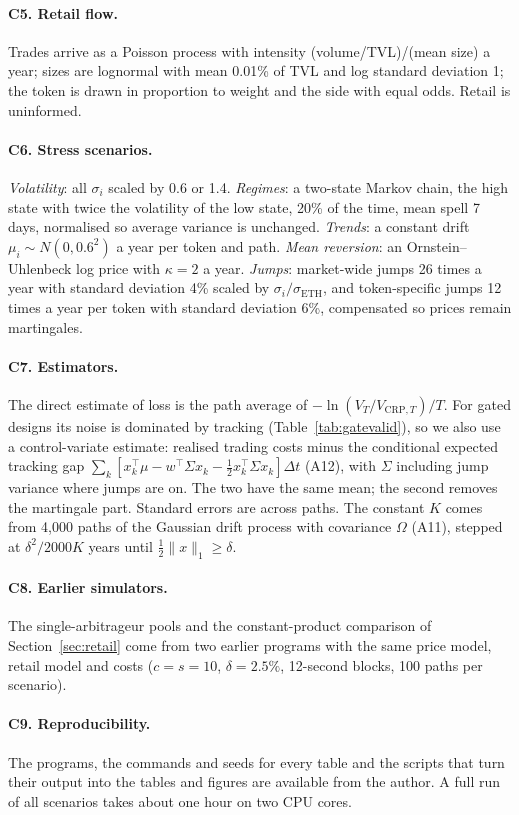 \paragraph{C5. Retail flow.} Trades arrive as a Poisson process with intensity (volume/TVL)/(mean size) a year; sizes are lognormal with mean 0.01\% of TVL and log standard deviation 1; the token is drawn in proportion to weight and the side with equal odds. Retail is uninformed.

\paragraph{C6. Stress scenarios.} \emph{Volatility}: all $\sigma_i$ scaled by 0.6 or 1.4. \emph{Regimes}: a two-state Markov chain, the high state with twice the volatility of the low state, 20\% of the time, mean spell 7 days, normalised so average variance is unchanged. \emph{Trends}: a constant drift $\mu_i\sim N(0,0.6^2)$ a year per token and path. \emph{Mean reversion}: an Ornstein--Uhlenbeck log price with $\kappa=2$ a year. \emph{Jumps}: market-wide jumps 26 times a year with standard deviation 4\% scaled by $\sigma_i/\sigma_{\mathrm{ETH}}$, and token-specific jumps 12 times a year per token with standard deviation 6\%, compensated so prices remain martingales.

\paragraph{C7. Estimators.} The direct estimate of loss is the path average of $-\ln(V_T/V_{\mathrm{CRP},T})/T$. For gated designs its noise is dominated by tracking (Table~\ref{tab:gatevalid}), so we also use a control-variate estimate: realised trading costs minus the conditional expected tracking gap $\sum_k[x_k^{\top}\mu-w^{\top}\Sigma x_k-\tfrac12x_k^{\top}\Sigma x_k]\Delta t$ (A12), with $\Sigma$ including jump variance where jumps are on. The two have the same mean; the second removes the martingale part. Standard errors are across paths. The constant $K$ comes from 4{,}000 paths of the Gaussian drift process with covariance $\Omega$ (A11), stepped at $\delta^2/2000K$ years until $\tfrac12\|x\|_1\ge\delta$.

\paragraph{C8. Earlier simulators.} The single-arbitrageur pools and the constant-product comparison of Section~\ref{sec:retail} come from two earlier programs with the same price model, retail model and costs ($c=s=10$\bps, $\delta=2.5\%$, 12-second blocks, 100 paths per scenario).

\paragraph{C9. Reproducibility.} The programs, the commands and seeds for every table and the scripts that turn their output into the tables and figures are available from the author. A full run of all scenarios takes about one hour on two CPU cores.
